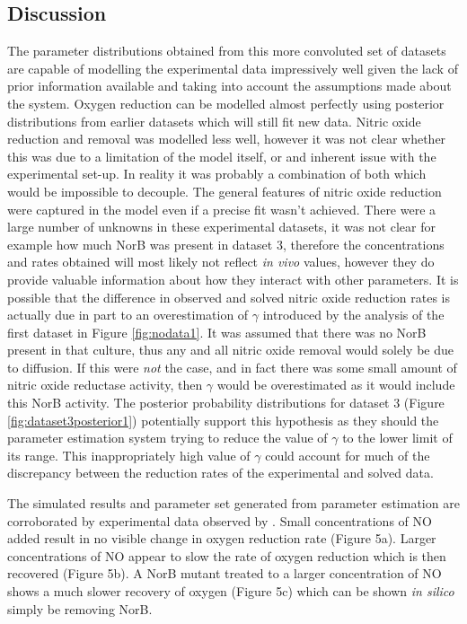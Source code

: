 \subsection{Discussion}
The parameter distributions obtained from this more convoluted set of datasets are capable of modelling the experimental data impressively well given the lack of prior information available and taking into account the assumptions made about the system. Oxygen reduction can be modelled almost perfectly using posterior distributions from earlier datasets which will still fit new data. Nitric oxide reduction and removal was modelled less well, however it was not clear whether this was due to a limitation of the model itself, or and inherent issue with the experimental set-up. In reality it was probably a combination of both which would be impossible to decouple. The general features of nitric oxide reduction were captured in the model even if a precise fit wasn't achieved. There were a large number of unknowns in these experimental datasets, it was not clear for example how much NorB was present in dataset 3, therefore the concentrations and rates obtained will most likely not reflect \textit{in vivo} values, however they do provide valuable information about how they interact with other parameters. It is possible that the difference in observed and solved nitric oxide reduction rates is actually due in part to an overestimation of $\gamma$ introduced by the analysis of the first dataset in Figure \ref{fig:nodata1}. It was assumed that there was no NorB present in that culture, thus any and all nitric oxide removal would solely be due to diffusion. If this were \textit{not} the case, and in fact there was some small amount of nitric oxide reductase activity, then $\gamma$ would be overestimated as it would include this NorB activity. The posterior probability distributions for dataset 3 (Figure \ref{fig:dataset3posterior1}) potentially support this hypothesis as they should the parameter estimation system trying to reduce the value of $\gamma$ to the lower limit of its range. This inappropriately high value of $\gamma$ could account for much of the discrepancy between the reduction rates of the experimental and solved data.

The simulated results and parameter set generated from parameter estimation are corroborated by experimental data observed by \citet{Anjum2002}. Small concentrations of NO added result in no visible change in oxygen reduction rate (Figure 5a). Larger concentrations of NO appear to slow the rate of oxygen reduction which is then recovered (Figure 5b). A NorB mutant treated to a larger concentration of NO shows a much slower recovery of oxygen (Figure 5c) which can be shown \textit{in silico} simply be removing NorB.


